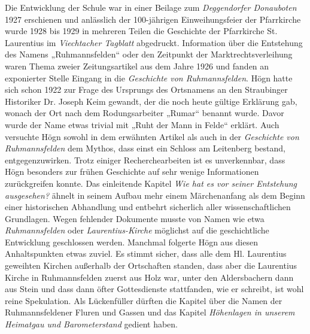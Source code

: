 \documentclass{book}
\begin{document}
Die Entwicklung der Schule war in einer Beilage zum \textit{Deggendorfer
Donau\-boten} 1927 erschienen und anlässlich der 100-jährigen
Einweihungsfeier der Pfarrkirche wurde 1928 bis 1929 in mehreren Teilen
die Geschichte der Pfarr\-kirche St. Laurentius im \textit{Viechtacher
Tagblatt} abgedruckt. Information über die Entstehung des Namens
„Ruhmannsfelden“ oder den Zeitpunkt der Markt\-rechtsverleihung waren
Thema zweier Zeitungsartikel aus dem Jahre 1926 und fanden an
exponierter Stelle Eingang in die \textit{Geschichte von
Ruhmannsfelden}. Högn hatte sich schon 1922 zur Frage des Ursprungs des
Ortsnamens an den Strau\-binger Historiker Dr. Joseph Keim gewandt, der
die noch heute gültige Er\-klärung gab, wonach der Ort nach dem
Rodungsarbeiter „Rumar“ benannt wurde. Davor wurde der Name etwas
trivial mit „Ruht der Mann in Felde“ er\-klärt. Auch versuchte Högn
sowohl in dem erwähnten Artikel als auch in der \textit{Geschichte von
Ruhmannsfelden} dem Mythos, dass einst ein Schloss am Leitenberg
bestand, entgegenzuwirken. Trotz einiger Recherchearbeiten ist es
unverkenn\-bar, dass Högn besonders zur frühen Geschichte auf sehr
wenige Infor\-mationen zurückgreifen konnte. Das einleitende Kapitel
\textit{Wie hat es vor seiner Entstehung ausgesehen?} ähnelt in seinem
Aufbau mehr einem Märchenanfang als dem Beginn einer historischen
Abhandlung und entbehrt sicherlich aller wis\-senschaftlichen
Grundlagen. Wegen fehlender Dokumente musste von Na\-men wie etwa
\textit{Ruhmannsfelden} oder \textit{Laurentius-Kirche} möglichst auf
die geschicht\-liche Entwicklung geschlossen werden. Manchmal folgerte
Högn aus diesen Anhaltspunkten etwas zuviel. Es stimmt sicher, dass
alle dem Hl. Laurentius geweihten Kirchen außerhalb der Ortschaften
standen, dass aber die Lauren\-tius Kirche in Ruhmannsfelden zuerst aus
Holz war, unter den Aldersbachern dann aus Stein und dass dann öfter
Gottesdienste stattfanden, wie er schreibt, ist wohl reine Spekulation.
Als Lückenfüller dürften die Kapitel über die Na\-men der
Ruhmannsfeldener Fluren und Gassen und das Kapitel \textit{Höhenlagen
in unserem Heimatgau und Barometerstand} gedient haben.

\end{document}
